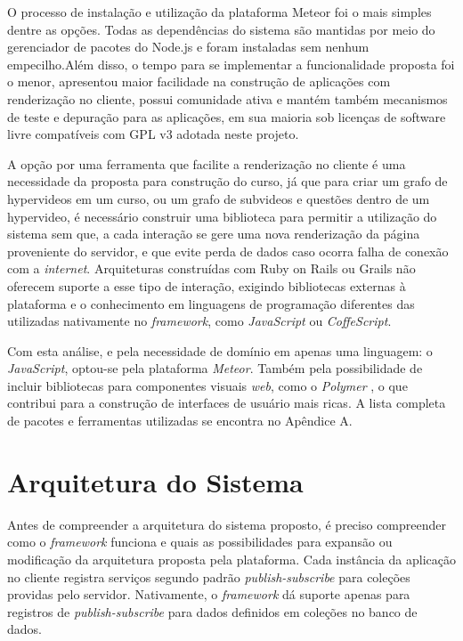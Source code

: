 O processo de instalação e utilização da plataforma Meteor foi o mais simples dentre as opções. Todas as dependências do sistema são mantidas por meio do gerenciador de pacotes do Node.js \cite{nodejs2015} e foram instaladas sem nenhum empecilho.Além disso, o tempo para se implementar a funcionalidade proposta foi o menor, apresentou maior facilidade na construção de aplicações com renderização no cliente, possui comunidade ativa e mantém também mecanismos de teste e depuração para as aplicações, em sua maioria sob licenças de software livre compatíveis com GPL v3 adotada neste projeto.

A opção por uma ferramenta que facilite a renderização no cliente é uma necessidade da proposta para construção do curso, já que para criar um grafo de hypervideos em um curso, ou um grafo de subvideos e questões dentro de um hypervideo, é necessário construir uma biblioteca para permitir a utilização do sistema sem que, a cada interação se gere uma nova renderização da página proveniente do servidor, e que evite perda de dados caso ocorra falha de conexão com a \textit{internet}. Arquiteturas construídas com Ruby on Rails ou Grails não oferecem suporte a esse tipo de interação, exigindo bibliotecas externas à plataforma e o conhecimento em linguagens de programação diferentes das utilizadas nativamente no \textit{framework}, como \textit{JavaScript} ou \textit{CoffeScript}.

Com esta análise, e pela necessidade de domínio em apenas uma linguagem: o \textit{JavaScript}, optou-se pela plataforma \textit{Meteor}. Também pela possibilidade de incluir bibliotecas para componentes visuais \textit{web}, como o \textit{Polymer} \cite{polymer2015}, o que contribui para a construção de interfaces de usuário mais ricas. A lista completa de pacotes e ferramentas utilizadas se encontra no Apêndice A.

\section{Arquitetura do Sistema}

Antes de compreender a arquitetura do sistema proposto, é preciso compreender como o \textit{framework} funciona e quais as possibilidades para expansão ou modificação da arquitetura proposta pela plataforma. Cada instância da aplicação no cliente registra serviços segundo padrão \textit{publish-subscribe} para coleções providas pelo servidor. Nativamente, o \textit{framework} dá suporte apenas para registros de \textit{publish-subscribe} para dados definidos em coleções no banco de dados.

